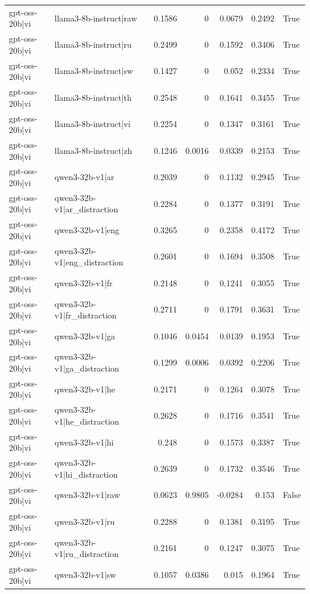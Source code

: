 \begin{table}
\begin{tabular}{l l r r r r l}
gpt-oss-20b|vi & llama3-8b-instruct|raw & 0.1586 & 0 & 0.0679 & 0.2492 & True \\
gpt-oss-20b|vi & llama3-8b-instruct|ru & 0.2499 & 0 & 0.1592 & 0.3406 & True \\
gpt-oss-20b|vi & llama3-8b-instruct|sw & 0.1427 & 0 & 0.052 & 0.2334 & True \\
gpt-oss-20b|vi & llama3-8b-instruct|th & 0.2548 & 0 & 0.1641 & 0.3455 & True \\
gpt-oss-20b|vi & llama3-8b-instruct|vi & 0.2254 & 0 & 0.1347 & 0.3161 & True \\
gpt-oss-20b|vi & llama3-8b-instruct|zh & 0.1246 & 0.0016 & 0.0339 & 0.2153 & True \\
gpt-oss-20b|vi & qwen3-32b-v1|ar & 0.2039 & 0 & 0.1132 & 0.2945 & True \\
gpt-oss-20b|vi & qwen3-32b-v1|ar_distraction & 0.2284 & 0 & 0.1377 & 0.3191 & True \\
gpt-oss-20b|vi & qwen3-32b-v1|eng & 0.3265 & 0 & 0.2358 & 0.4172 & True \\
gpt-oss-20b|vi & qwen3-32b-v1|eng_distraction & 0.2601 & 0 & 0.1694 & 0.3508 & True \\
gpt-oss-20b|vi & qwen3-32b-v1|fr & 0.2148 & 0 & 0.1241 & 0.3055 & True \\
gpt-oss-20b|vi & qwen3-32b-v1|fr_distraction & 0.2711 & 0 & 0.1791 & 0.3631 & True \\
gpt-oss-20b|vi & qwen3-32b-v1|ga & 0.1046 & 0.0454 & 0.0139 & 0.1953 & True \\
gpt-oss-20b|vi & qwen3-32b-v1|ga_distraction & 0.1299 & 0.0006 & 0.0392 & 0.2206 & True \\
gpt-oss-20b|vi & qwen3-32b-v1|he & 0.2171 & 0 & 0.1264 & 0.3078 & True \\
gpt-oss-20b|vi & qwen3-32b-v1|he_distraction & 0.2628 & 0 & 0.1716 & 0.3541 & True \\
gpt-oss-20b|vi & qwen3-32b-v1|hi & 0.248 & 0 & 0.1573 & 0.3387 & True \\
gpt-oss-20b|vi & qwen3-32b-v1|hi_distraction & 0.2639 & 0 & 0.1732 & 0.3546 & True \\
gpt-oss-20b|vi & qwen3-32b-v1|raw & 0.0623 & 0.9805 & -0.0284 & 0.153 & False \\
gpt-oss-20b|vi & qwen3-32b-v1|ru & 0.2288 & 0 & 0.1381 & 0.3195 & True \\
gpt-oss-20b|vi & qwen3-32b-v1|ru_distraction & 0.2161 & 0 & 0.1247 & 0.3075 & True \\
gpt-oss-20b|vi & qwen3-32b-v1|sw & 0.1057 & 0.0386 & 0.015 & 0.1964 & True \\

\end{tabular}
\end{table}
